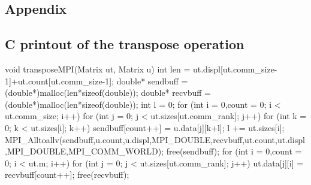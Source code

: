 \documentclass[11pt,a4paper,english]{article}
\numberwithin{figure}{subsection}
\numberwithin{table}{subsection}
\begin{document}
\begin{appendix}
\section{Appendix}
\subsection{C printout of the transpose operation}
\begin{ccode}
void transposeMPI(Matrix ut, Matrix u){
	int len = ut.displ[ut.comm_size-1]+ut.count[ut.comm_size-1];
	double* sendbuff = (double*)malloc(len*sizeof(double));
	double* recvbuff = (double*)malloc(len*sizeof(double));
	int l = 0;
	for (int i = 0,count = 0; i < ut.comm_size; i++){
		for (int j = 0; j < ut.sizes[ut.comm_rank]; j++){
			for (int k = 0; k < ut.sizes[i]; k++){
				sendbuff[count++] = u.data[j][k+l];
			}
		}
		l += ut.sizes[i];
	}
	MPI_Alltoallv(sendbuff,u.count,u.displ,MPI_DOUBLE,recvbuff,ut.count,ut.displ,MPI_DOUBLE,MPI_COMM_WORLD);
	free(sendbuff);
	for (int i = 0,count = 0; i < ut.m; i++){
		for (int j = 0; j < ut.sizes[ut.comm_rank]; j++){
			ut.data[j][i] = recvbuff[count++];
		}
	}
	free(recvbuff);
}
\end{ccode}

\end{appendix}
\end{document}
